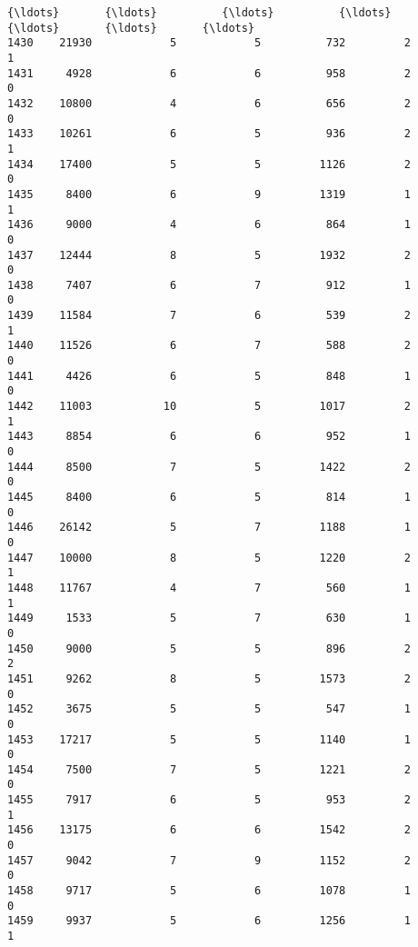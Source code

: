\documentclass[11pt]{article}
\begin{document}
\begin{tcolorbox}[breakable, boxrule=.5pt, size=fbox, pad at break*=1mm, opacityfill=0]
\begin{Verbatim}[commandchars=\\\{\}]
{\ldots}       {\ldots}          {\ldots}          {\ldots}          {\ldots}       {\ldots}       {\ldots}
1430    21930            5            5          732         2         1
1431     4928            6            6          958         2         0
1432    10800            4            6          656         2         0
1433    10261            6            5          936         2         1
1434    17400            5            5         1126         2         0
1435     8400            6            9         1319         1         1
1436     9000            4            6          864         1         0
1437    12444            8            5         1932         2         0
1438     7407            6            7          912         1         0
1439    11584            7            6          539         2         1
1440    11526            6            7          588         2         0
1441     4426            6            5          848         1         0
1442    11003           10            5         1017         2         1
1443     8854            6            6          952         1         0
1444     8500            7            5         1422         2         0
1445     8400            6            5          814         1         0
1446    26142            5            7         1188         1         0
1447    10000            8            5         1220         2         1
1448    11767            4            7          560         1         1
1449     1533            5            7          630         1         0
1450     9000            5            5          896         2         2
1451     9262            8            5         1573         2         0
1452     3675            5            5          547         1         0
1453    17217            5            5         1140         1         0
1454     7500            7            5         1221         2         0
1455     7917            6            5          953         2         1
1456    13175            6            6         1542         2         0
1457     9042            7            9         1152         2         0
1458     9717            5            6         1078         1         0
1459     9937            5            6         1256         1         1


\end{Verbatim}
\end{tcolorbox}
\end{document}
